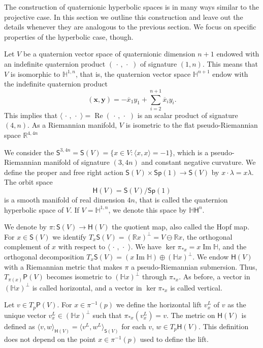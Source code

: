 \documentclass[12pt, a4paper]{amsart}
\newcommand{\R}{\mathbb{R}}
\renewcommand{\H}{\mathbb{H}}
\renewcommand{\Re}{\operatorname{Re}}
\renewcommand{\Im}{\operatorname{Im}}
\newcommand{\Sp}{\mathsf{Sp}}
\theoremstyle{remark}
\begin{document}
The construction of quaternionic hyperbolic spaces is in many ways similar to the projective case.
In this section we outline this construction and leave out the details whenever they are analogous to the previous section.
We focus on specific properties of the hyperbolic case, though.

Let $V$ be a quaternion vector space of quaternionic dimension $n+1$ endowed with an indefinite quaternion product $(\,\cdot\,,\,\cdot\,\,)$ of signature $(1,n)$.
This means that $V$ is isomorphic to $\H^{1,n}$, that is, the quaternion vector space $\H^{n+1}$ endow with the indefinite quaternion product 
\[
(\mathbf{x},\mathbf{y})
=-\overline{x}_1{y}_1+\sum_{i=2}^{n+1}\overline{x}_i {y}_i.
\]
This implies that $\langle\,\cdot\,,\,\cdot\,\,\rangle=\Re(\,\cdot\,,\,\cdot\,\,)$ is an scalar product of signature $(4,n)$.
As a Riemannian manifold, $V$ is isometric to the flat pseudo-Riemannian space $\R^{4,4n}$

We consider the $\mathsf{S}^{3,4n}=\mathsf{S}(V)=\{{x}\in V:\langle {x},{x}\rangle=-1\}$,
which is a pseudo-Riemannian manifold of signature $(3,4n)$ and constant negative curvature.
We define the proper and free right action $\mathsf{S}(V)\times\Sp(1)\to\mathsf{S}(V)$ by ${x}\cdot \lambda={x}\lambda$.
The orbit space 
\[
\mathsf{H}(V)=\mathsf{S}(V)/\Sp(1)
\]
is a smooth manifold of real dimension $4n$, that is called the quaternion hyperbolic space of $V$.
If $V=\H^{1,n}$, we denote this space by $\H \mathsf{H}^n$.

We denote by $\pi\colon\mathsf{S}(V)\to\mathsf{H}(V)$ the quotient map, also called the Hopf map.
For ${x}\in\mathsf{S}(V)$ we identify $T_{x}\mathsf{S}(V)=(\R{x})^\perp=V\ominus\R{x}$, the orthogonal complement of ${x}$ with respect to $\langle\,\cdot\,,\,\cdot\,\,\rangle$.
We have $\ker\pi_{*{x}}={x}\Im\H$, and the orthogonal decomposition $T_{x}\mathsf{S}(V)=({x}\Im\H)\oplus(\H{x})^\perp$.
We endow $\mathsf{H}(V)$ with a Riemannian metric that makes $\pi$ a pseudo-Riemannian submersion.
Thus, $T_{\pi({x})}\mathsf{P}(V)$ becomes isometric to $(\H{x})^\perp$ through $\pi_{*{x}}$.
As before, a vector in $(\H x)^\perp$ is called horizontal, and a vector in $\ker\pi_{*x}$ is called vertical.

Let $v\in T_{p}\mathsf{P}(V)$.
For ${x}\in\pi^{-1}(p)$ we define the horizontal lift $v^L_{x}$ of $v$ as the unique vector $v_x^L\in(\H{x})^\perp$ such that $\pi_{*{x}}(v^L_{x})=v$.
The metric on $\mathsf{H}(V)$ is defined as 
$\langle v,w\rangle_{\mathsf{H}(V)}=\langle v^L,w^L\rangle_{\mathsf{S}(V)}$ 
for each $v$, $w\in T_p\mathsf{H}(V)$.
This definition does not depend on the point ${x}\in\pi^{-1}(p)$ used to define the lift.
\end{document}
